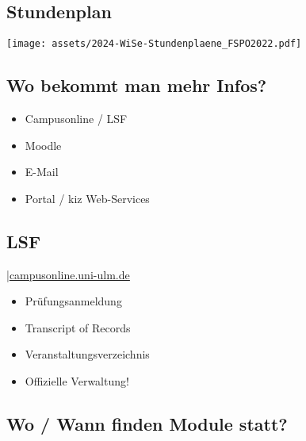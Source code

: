 \documentclass[
	aspectratio=169, 
	8pt 
]{beamer}
\newcommand*\annotatedFigureBoxCustom[8]{\draw[#5,thick,rounded corners] (#1) rectangle (#2);\node at (#4) [fill=#6,thick,shape=circle,draw=#7,inner sep=2pt,font=\sffamily,text=#8] {\textbf{#3}};}
\newcommand*\annotatedFigureBox[4]{\annotatedFigureBoxCustom{#1}{#2}{#3}{#4}{black}{white}{black}{black}}
\newenvironment {annotatedFigure}[1]{\centering\begin{tikzpicture}
    \node[anchor=south west,inner sep=0] (image) at (0,0) { #1};\begin{scope}[x={(image.south east)},y={(image.north west)}]}{\end{scope}\end{tikzpicture}}
\begin{document}
\subsection{Stundenplan}
\begin{frame}{\insertsubsection}
    \begin{fancycolumns}[widths={30}]
        \nextcolumn
        \texttt{[image: assets/2024-WiSe-Stundenplaene\_FSPO2022.pdf]}
    \end{fancycolumns} 
\end{frame}


\subsection{Wo bekommt man mehr Infos?}
\begin{frame}{\insertsubsection}
    \begin{itemize}
        \item Campusonline / LSF
        \item Moodle
        \item E-Mail
        \item Portal / kiz Web-Services
    \end{itemize}
\end{frame}

\subsection{LSF}
\begin{frame}{\insertsubsection \space|\space\underline{\href{https://campusonline.uni-ulm.de}{campusonline.uni-ulm.de}}}
    \begin{itemize}
        \item Prüfungsanmeldung
        \item Transcript of Records
        \item Veranstaltungsverzeichnis
        \item Offizielle Verwaltung!
    \end{itemize}
\end{frame}

\subsection{Wo / Wann finden Module statt?}
\end{document}
